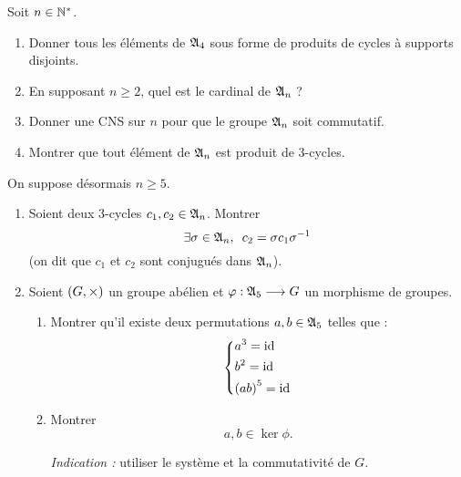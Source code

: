 \begin{corr}
\end{corr}

\begin{exo}
Soit \(n\in\mathbb{N}^*\).

\begin{enumerate}[series=exoAn]
\item Donner tous les éléments de \(\frak{A}_{4}\) sous forme de produits de cycles à supports disjoints. \\

\item En supposant \(n\geq2\), quel est le cardinal de \(\frak{A}_{n}\) ? \\

\item Donner une CNS sur \(n\) pour que le groupe \(\frak{A}_{n}\) soit commutatif. \\

\item Montrer que tout élément de \(\frak{A}_{n}\) est produit de \(3\)-cycles.
\end{enumerate}

On suppose désormais \(n\geq5\).

\begin{enumerate}[resume=exoAn]
\item Soient deux \(3\)-cycles \(c_1,c_2\in\frak{A}_{n}\). Montrer \[\quantifs{\exists\sigma\in\frakA{n}}c_2=\sigma c_1\sigma\inv\] (on dit que \(c_1\) et \(c_2\) sont conjugués dans \(\frak{A}_{n}\)). \\

\item Soient \(\groupe{G}[\times]\) un groupe abélien et \(\varphi:\frak{A}_{5}\longrightarrow G\) un morphisme de groupes.

\begin{enumerate}
\item Montrer qu'il existe deux permutations \(a,b\in\frak{A}_{5}\) telles que : \[\begin{dcases}a^3=\mathrm{id}_{} \\ b^2=\mathrm{id}_{} \\ \left(ab\right)^5=\mathrm{id}_{}\end{dcases}\]

\item Montrer \[a,b\in\ker\phi.\]

\textit{Indication :} utiliser le système et la commutativité de \(G\). \\


\end{enumerate}
\end{enumerate}
\end{exo}
